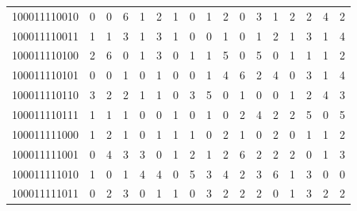 \documentclass[10pt,a4paper]{article}
\begin{document}
\begin{longtable}{ |c|c|c|c|c|c|c|c|c|c|c|c|c|c|c|c|c| }
    100011110010              & 0                            & 0                                & 6                            & 1                              & 2   & 1   & 0   & 1   & 2   & 0   & 3   & 1   & 2   & 2   & 4   & 2   \\
    100011110011              & 1                            & 1                                & 3                            & 1                              & 3   & 1   & 0   & 0   & 1   & 0   & 1   & 2   & 1   & 3   & 1   & 4   \\
    100011110100              & 2                            & 6                                & 0                            & 1                              & 3   & 0   & 1   & 1   & 5   & 0   & 5   & 0   & 1   & 1   & 1   & 2   \\
    100011110101              & 0                            & 0                                & 1                            & 0                              & 1   & 0   & 0   & 1   & 4   & 6   & 2   & 4   & 0   & 3   & 1   & 4   \\
    100011110110              & 3                            & 2                                & 2                            & 1                              & 1   & 0   & 3   & 5   & 0   & 1   & 0   & 0   & 1   & 2   & 4   & 3   \\
    100011110111              & 1                            & 1                                & 1                            & 0                              & 0   & 1   & 0   & 1   & 0   & 2   & 4   & 2   & 2   & 5   & 0   & 5   \\
    100011111000              & 1                            & 2                                & 1                            & 0                              & 1   & 1   & 1   & 0   & 2   & 1   & 0   & 2   & 0   & 1   & 1   & 2   \\
    100011111001              & 0                            & 4                                & 3                            & 3                              & 0   & 1   & 2   & 1   & 2   & 6   & 2   & 2   & 2   & 0   & 1   & 3   \\
    100011111010              & 1                            & 0                                & 1                            & 4                              & 4   & 0   & 5   & 3   & 4   & 2   & 3   & 6   & 1   & 3   & 0   & 0   \\
    100011111011              & 0                            & 2                                & 3                            & 0                              & 1   & 1   & 0   & 3   & 2   & 2   & 2   & 0   & 1   & 3   & 2   & 2   \\

\end{longtable}
\end{document}
